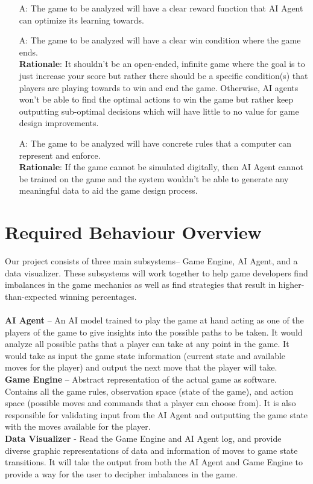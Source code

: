\documentclass[12pt]{article}
\newcounter{assumpnum} %
\begin{document}
\begin{itemize}

\item[A\refstepcounter{assumpnum}\theassumpnum \label{A_Reward_Function}:]
  The game to be analyzed will have a clear reward function that AI Agent can optimize its learning towards.
  
\item[A\refstepcounter{assumpnum}\theassumpnum \label{A_End_Condition}:]
  The game to be analyzed will have a clear win condition where the game ends.\\ 
  \textbf{Rationale}: It shouldn't be an open-ended, infinite game where the goal is to just increase your score but rather there should be a specific condition(s) that players are playing towards to win and end the game. Otherwise, AI agents won't be able to find the optimal actions to win the game but rather keep outputting sub-optimal decisions which will have little to no value for game design improvements.
  
\item[A\refstepcounter{assumpnum}\theassumpnum \label{A_Representable}:]
  The game to be analyzed will have concrete rules that a computer can represent and enforce.\\
  \textbf{Rationale}: If the game cannot be simulated digitally, then AI Agent cannot be trained on the game and the system wouldn't be able to generate any meaningful data to aid the game design process.

\end{itemize}

\section{Required Behaviour Overview}
Our project consists of three main subsystems– Game Engine, AI Agent, and a data visualizer. These subsystems will work together to help game developers find imbalances in the game mechanics as well as find strategies that result in higher-than-expected winning percentages. 
\\\\
\textbf{AI Agent} – An AI model trained to play the game at hand acting as one of the players of the game to give insights into the possible paths to be taken. It would analyze all possible paths that a player can take at any point in the game. It would take as input the game state information (current state and available moves for the player) and output the next move that the player will take. 
\\
\textbf{Game Engine} – Abstract representation of the actual game as software. Contains all the game rules, observation space (state of the game), and action space (possible moves and commands that a player can choose from). It is also responsible for validating input from the AI Agent and outputting the game state with the moves available for the player. 
\\
\textbf{Data Visualizer} - Read the Game Engine and AI Agent log, and provide diverse graphic representations of data and information of moves to game state transitions. It will take the output from both the AI Agent and Game Engine to provide a way for the user to decipher imbalances in the game.
\end{document}
